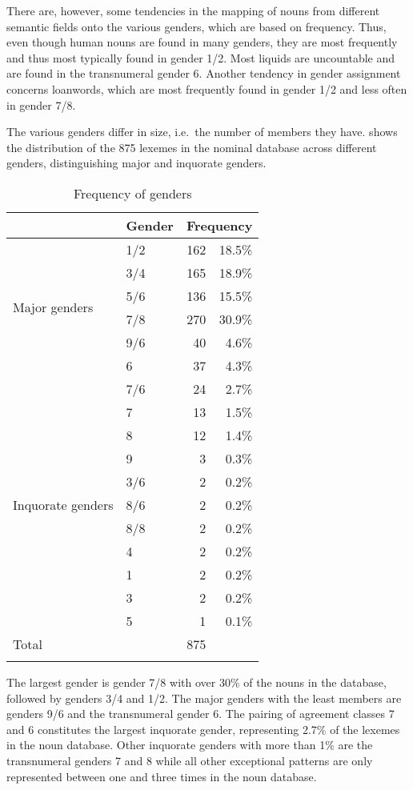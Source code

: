 There are, however, some tendencies in the mapping of nouns from different semantic fields onto the various genders, which are based on frequency. Thus, even though human nouns are found in many genders, they are most frequently and thus most typically found in gender 1/2.  Most liquids are uncountable and are found in the transnumeral gender 6. 
Another tendency in gender assignment concerns loanwords, which are most frequently found in gender 1/2 and less often in gender 7/8.


The various genders differ in size, i.e.\ the number of members they have.
 shows the distribution of the 875 lexemes in the nominal database across different genders, distinguishing major and inquorate genders.


\begin{table}
\begin{tabular}{ll rr}
 \lsptoprule
 & Gender &  \multicolumn{2}{l}{Frequency}  \\ 
 \midrule
 \multirow{6}{*}{{Major genders}} & 1/2 & 162 & 18.5\%  \\
 & 3/4  & 165 & 18.9\% \\
 & 5/6  & 136 & 15.5\%   \\
& 7/8   & 270 & 30.9\% \\
& 9/6   & 40  & 4.6\% \\
 & 6 &  37 & 4.3\% \\
 \midrule %
 \multirow{11}{*}{{Inquorate genders}} &  7/6  & 24  & 2.7\% \\
 & 7   & 13  & 1.5\% \\
 & 8   & 12  & 1.4\% \\
 & 9   & 3  & 0.3\% \\
 & 3/6  & 2  & 0.2\% \\
 & 8/6   &  2 & 0.2\% \\
& 8/8   & 2 & 0.2\% \\
&  4   & 2  & 0.2\% \\
 & 1   & 2  & 0.2\% \\
 & 3   & 2  & 0.2\% \\
 & 5   & 1  & 0.1\% \\
 \midrule
Total & &  875 & \\
 \lspbottomrule
\end{tabular}
\caption{Frequency of genders}
\label{Tab:genderno}
\end{table}

The largest gender is gender 7/8 with over 30\% of the nouns in the database, followed by genders 3/4 and 1/2. The major genders with the least members are genders 9/6 and the transnumeral gender 6. The pairing of agreement classes 7 and 6  constitutes the largest inquorate gender, representing 2.7\% of the lexemes in the noun database. Other inquorate genders with more than 1\% are the transnumeral genders 7 and 8 while all other exceptional patterns are only represented between one and three times in the noun database.

